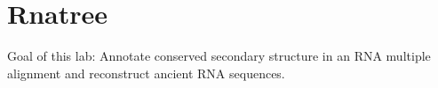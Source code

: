 \chapter{Rnatree}

Goal of this lab:
Annotate conserved secondary structure in an RNA multiple alignment and reconstruct ancient RNA sequences.

